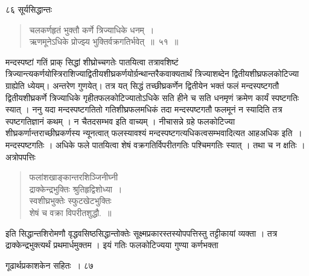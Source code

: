 \documentclass[11pt, openany]{book}
\begin{document}
\noindent ८६ \hspace{4cm} सूर्यसिद्धान्तः
\vspace{1cm}
\begin{quote}

{\ssi चलकर्णहृतं भुक्तौ कर्णे त्रिज्याधिके धनम्~।\\
ऋणमूनेऽधिके प्रोज्झ्य भुक्तिर्वक्रगतिर्भवेत्~॥~५१~॥}
\end{quote}
\begin{sloppypar}
मन्दस्पष्टां गतिं प्राक् सिद्धां शीघ्रोच्चगतेः पातयित्वा तत्रावशिष्टं त्रिज्यान्त्यकर्णयोस्त्रिराशिज्याद्वितीयशीघ्रकर्णयोर्ग्रन्थान्तरैकवाक्यतार्थं त्रिज्याशब्देन द्वितीयशीघ्रफलकोटिज्या ग्राह्येति ध्येयम्। अन्तरेण गुणयेत्। तत्र यत् सिद्धं तच्छीघ्रकर्णेन द्वितीयेन भक्तं फलं मन्दस्पष्टगतौ द्वितीयशीघ्रकर्णे त्रिज्याधिके गृहीतफलकोटिज्यातोऽधिके सति हीने च सति धनमृणं क्रमेण कार्यं स्पष्टगतिः स्यात् । ननु यदा मन्दस्पष्टगतितो गतिशीघ्रफलमधिकं तदा मन्दस्पष्टगतौ फलमूनं न स्यादिति तत्र स्पष्टगतिज्ञानं कथम् । न चैतदसम्भव इति वाच्यम् । नीचासन्ने ग्रहे फलकोटिज्या शीघ्रकर्णान्तराच्छीघ्रकर्णस्य न्यूनत्वात् फलस्यावश्यं मन्दस्पष्टगत्यधिकत्वसम्भवादित्यत आह\textendash अधिक इति~। मन्दस्पष्टगतिः । अधिके फले पातयित्वा शेषं वक्रगतिर्विपरीतगतिः पश्चिमगतिः स्यात् । तथा च न क्षतिः । अत्रोपपत्तिः\textendash
\end{sloppypar}
\begin{quote}

{\qt फलांशखाङ्कान्तरशिञ्जिनीघ्नी\\
द्राक्केन्द्रभुक्तिः श्रुतिहृद्विशोध्या~।\\
स्वशीघ्रभुक्तेः स्फुटखेटभुक्तिः\\
शेषं च वक्रा विपरीतशुद्धौ.~॥}
\end{quote}
\begin{sloppypar}
इति सिद्धान्तशिरोमणौ वृद्धवसिष्ठसिद्धान्तोक्तेः सूक्ष्मप्रकारस्तस्योपपत्तिस्तु तट्टीकायां व्यक्ता । तत्र द्राक्केन्द्रभुक्त्यर्थं प्रथमार्धमुक्तम । इयं गतिः फलकोटिज्यया गुण्या कर्णभक्ता
\end{sloppypar}


\newpage




\hspace{3cm}गूढार्थप्रकाशकेन सहितः~। \hfill ८७
\vspace{1cm}
\end{document}
